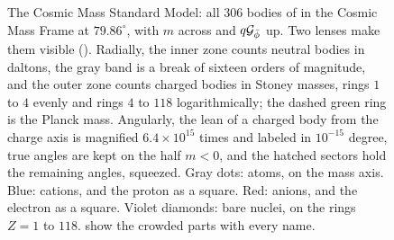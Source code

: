 \begin{figure}[p]
\myfloatalign
\makebox[\textwidth][c]{\begin{tikzpicture}[x=1mm, y=1mm, >=Stealth]\end{tikzpicture}}
\caption[The Cosmic Mass Standard Model]{The Cosmic Mass Standard Model: all 306 bodies of  in the Cosmic Mass Frame at $79.86^\circ$, with $m$ across and $q\mathcal{G}_{\bar{\phi}}$ up. Two lenses make them visible (). Radially, the inner zone counts neutral bodies in daltons, the gray band is a break of sixteen orders of magnitude, and the outer zone counts charged bodies in Stoney masses, rings $1$ to $4$ evenly and rings $4$ to $118$ logarithmically; the dashed green ring is the Planck mass. Angularly, the lean of a charged body from the charge axis is magnified $6.4 \times 10^{15}$ times and labeled in $10^{-15}$ degree, true angles are kept on the half $m < 0$, and the hatched sectors hold the remaining angles, squeezed. Gray dots: atoms, on the mass axis. Blue: cations, and the proton as a square. Red: anions, and the electron as a square. Violet diamonds: bare nuclei, on the rings $Z = 1$ to $118$.  show the crowded parts with every name.}
\label{fig:standard-model}
\end{figure}

